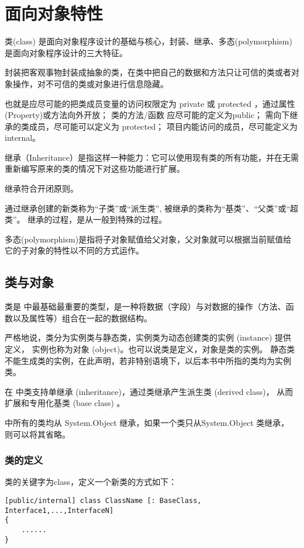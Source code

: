 
\chapter{\cs 面向对象特性}

类(class) 是面向对象程序设计的基础与核心，封装、继承、多态(polymorphism)是面向对象程序设计的三大特征。

封装把客观事物封装成抽象的类，在类中把自己的数据和方法只让可信的类或者对象操作，对不可信的类或对象进行信息隐藏。

也就是应尽可能的把类成员变量的访问权限定为 private 或 protected ，通过属性(Property)或方法向外开放；
类的方法/函数 应尽可能的定义为public；
需向下继承的类成员，尽可能可以定义为 protected；
项目内能访问的成员，尽可能定义为internal。

继承（Inheritance）是指这样一种能力：它可以使用现有类的所有功能，并在无需重新编写原来的类的情况下对这些功能进行扩展。

继承符合开闭原则。

通过继承创建的新类称为“子类”或“派生类”, 被继承的类称为“基类”、“父类”或“超类”。
继承的过程，是从一般到特殊的过程。

多态(polymorphism)是指将子对象赋值给父对象，父对象就可以根据当前赋值给它的子对象的特性以不同的方式运作。


\section{类与对象}
类是 \cs 中最基础最重要的类型，是一种将数据（字段）与对数据的操作（方法、函数以及属性等）组合在一起的数据结构。

严格地说，类分为实例类与静态类，实例类为动态创建类的实例 (instance) 提供定义，
实例也称为对象 (object)。也可以说类是定义，对象是类的实例。
静态类不能生成类的实例，在此声明，若非特别语境下，以后本书中所指的类均为实例类。

在 \cs 中类支持单继承 (inheritance)，通过类继承产生派生类 (derived class)， 
从而扩展和专用化基类 (base class) 。

 \cs 中所有的类均从 System.Object 继承，如果一个类只从System.Object 类继承，
 则可以将其省略。

 \subsection{类的定义}

类的关键字为class，定义一个新类的方式如下：

\begin{lstlisting}
[public/internal] class ClassName [: BaseClass, Interface1,...,InterfaceN]
{
    ......
}
\end{lstlisting}

